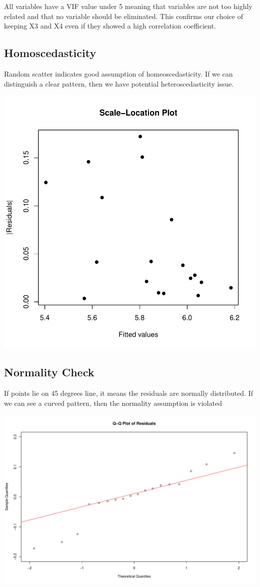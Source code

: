 \documentclass[
  11pt,
]{article}
\begin{document}
All variables have a VIF value under 5 meaning that variables are not
too highly related and that no variable should be eliminated. This
confirms our choice of keeping X3 and X4 even if they showed a high
correlation coefficient.

\subsection{Homoscedasticity}\label{homoscedasticity}

Random scatter indicates good assumption of homeoscedasticity. If we can
distinguish a clear pattern, then we have potential heteroscedasticity
issue.

\includegraphics{Figs/unnamed-chunk-18-1.pdf}

\subsection{Normality Check}\label{normality-check}

If points lie on 45 degrees line, it means the residuals are normally
distributed. If we can see a curved pattern, then the normality
assumption is violated

\includegraphics{Figs/unnamed-chunk-19-1.pdf}
\end{document}

